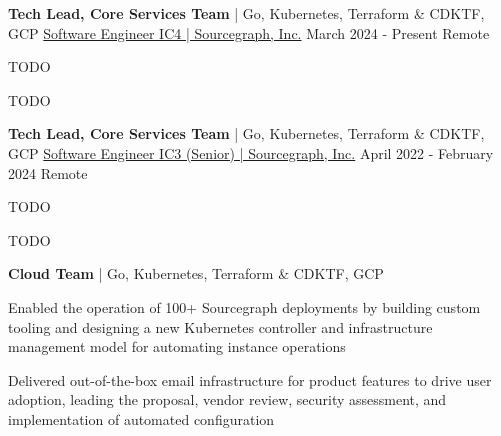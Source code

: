 
\begin{cventries}
  \cventry
    {\textbf{Tech Lead, Core Services Team} | Go, Kubernetes, Terraform \& CDKTF, GCP} %
    {\href{https://bobheadxi.dev/experience/sourcegraph}{Software Engineer IC4 | Sourcegraph, Inc.}} %
    {March 2024 - Present} %
    {Remote} %
    {
        \begin{cvitems}
          \item {TODO}
          \item {TODO}
        \end{cvitems}
    }

  \cventry
    {\textbf{Tech Lead, Core Services Team} | Go, Kubernetes, Terraform \& CDKTF, GCP} %
    {\href{https://bobheadxi.dev/experience/sourcegraph}{Software Engineer IC3 (Senior) | Sourcegraph, Inc.}} %
    {April 2022 - February 2024} %
    {Remote} %
    {
        \begin{cvitems}
          \item {TODO}
        \item {TODO}
        \end{cvitems}
    }

  \cventry
    {\textbf{Cloud Team} | Go, Kubernetes, Terraform \& CDKTF, GCP} %
    {} %
    {} %
    {} %
    {
        \begin{cvitems}
          \item {Enabled the operation of 100+ Sourcegraph deployments by building custom tooling and designing a new Kubernetes controller and infrastructure management model for automating instance operations}
          \item {Delivered out-of-the-box email infrastructure for product features to drive user adoption, leading the proposal, vendor review, security assessment, and implementation of automated configuration}
        \end{cvitems}
    }


\end{cventries}
